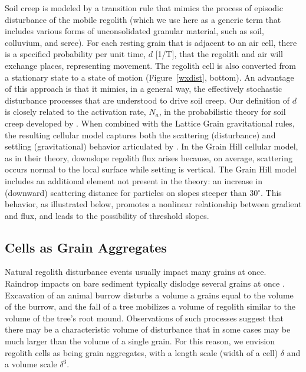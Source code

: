 \documentclass[esurf, manuscript]{copernicus}
\begin{document}
Soil creep is modeled by a transition rule that mimics the process of episodic disturbance of the mobile regolith (which we use here as a generic term that includes various forms of unconsolidated granular material, such as soil, colluvium, and scree). For each resting grain that is adjacent to an air cell, there is a specified probability per unit time, $d$ [1/T], that the regolith and air will exchange places, representing movement. The regolith cell is also converted from a stationary state to a state of motion (Figure~\ref{wxdist}, bottom). An advantage of this approach is that it mimics, in a general way, the effectively stochastic disturbance processes that are understood to drive soil creep. Our definition of $d$ is closely related to the activation rate, $N_a$, in the probabilistic theory for soil creep developed by \citet{furbish2009statistical}. When combined with the Lattice Grain gravitational rules, the resulting cellular model captures both the scattering (disturbance) and settling (gravitational) behavior articulated by \citet{furbish2009statistical}. In the Grain Hill cellular model, as in their theory, downslope regolith flux arises because, on average, scattering occurs normal to the local surface while setting is vertical. The Grain Hill model includes an additional element not present in the \citet{furbish2009statistical} theory: an increase in (downward) scattering distance for particles on slopes steeper than 30$^\circ$. This behavior, as illustrated below, promotes a nonlinear relationship between gradient and flux, and leads to the possibility of threshold slopes.



\subsection{Cells as Grain Aggregates}

Natural regolith disturbance events usually impact many grains at once. Raindrop impacts on bare sediment typically dislodge several grains at once \citep{furbish2007rain}. Excavation of an animal burrow disturbs a volume a grains equal to the volume of the burrow, and the fall of a tree mobilizes a volume of regolith similar to the volume of the tree's root mound. Observations of such processes suggest that there may be a characteristic volume of disturbance that in some cases may be much larger than the volume of a single grain. For this reason, we envision regolith cells as being grain aggregates, with a length scale (width of a cell) $\delta$ and a volume scale $\delta^3$.
\end{document}
